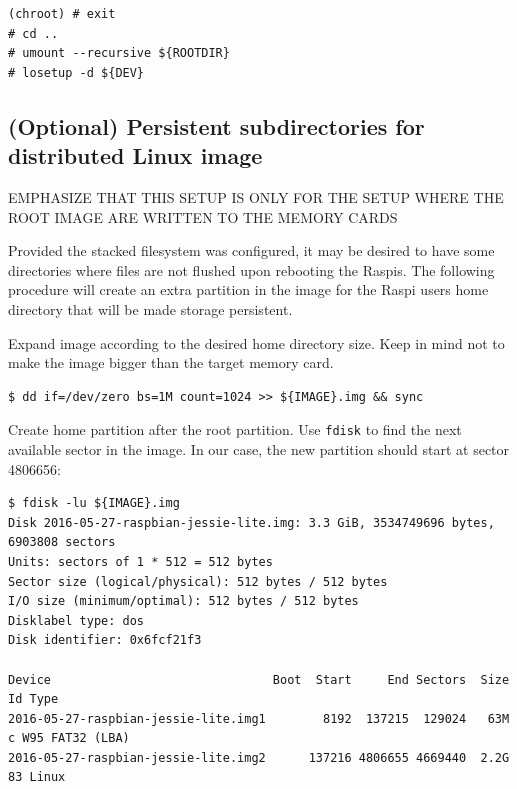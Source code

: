 \begin{lstlisting}[]
(chroot) # exit
# cd ..
# umount --recursive ${ROOTDIR}
# losetup -d ${DEV}
\end{lstlisting}
\FloatBarrier
\vspace{-5mm}

\subsection{(Optional) Persistent subdirectories for distributed Linux image}

EMPHASIZE THAT THIS SETUP IS ONLY FOR THE SETUP WHERE THE ROOT IMAGE ARE
WRITTEN TO THE MEMORY CARDS

Provided the stacked filesystem was configured, it may be desired to have
some directories where files are not flushed upon rebooting the \ac{Raspi}s.
The following procedure will create an extra partition in the image for
the \ac{Raspi} users home directory that will be made storage persistent.

Expand image according to the desired home directory size. Keep in mind not
to make the image bigger than the target memory card.
\begin{lstlisting}[]
$ dd if=/dev/zero bs=1M count=1024 >> ${IMAGE}.img && sync
\end{lstlisting}
\FloatBarrier
\vspace{-5mm}

Create home partition after the root partition. Use \texttt{fdisk} to
find the next available sector in the image. In our case, the new
partition should start at sector 4806656:
\begin{lstlisting}[]
$ fdisk -lu ${IMAGE}.img
Disk 2016-05-27-raspbian-jessie-lite.img: 3.3 GiB, 3534749696 bytes, 6903808 sectors
Units: sectors of 1 * 512 = 512 bytes
Sector size (logical/physical): 512 bytes / 512 bytes
I/O size (minimum/optimal): 512 bytes / 512 bytes
Disklabel type: dos
Disk identifier: 0x6fcf21f3

Device                               Boot  Start     End Sectors  Size Id Type
2016-05-27-raspbian-jessie-lite.img1        8192  137215  129024   63M  c W95 FAT32 (LBA)
2016-05-27-raspbian-jessie-lite.img2      137216 4806655 4669440  2.2G 83 Linux
\end{lstlisting}
\FloatBarrier
\vspace{-5mm}

